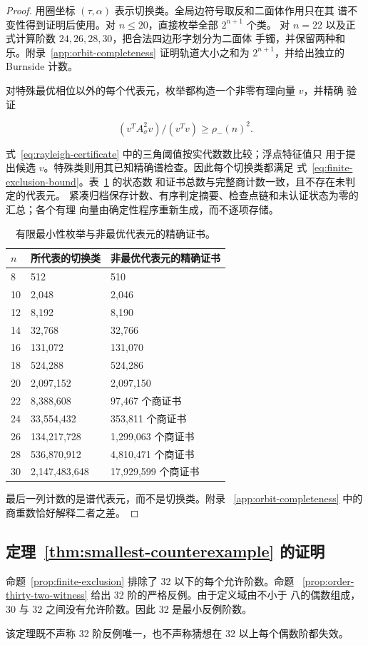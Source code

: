 \begin{proof}
用圈坐标 \((\tau,\alpha)\) 表示切换类。全局边符号取反和二面体作用只在其
谱不变性得到证明后使用。对 \(n\leq 20\)，直接枚举全部 \(2^{n+1}\) 个类。
对 \(n=22\) 以及正式计算阶数 \(24,26,28,30\)，把合法四边形字划分为二面体
手镯，并保留两种和乐。附录~\ref{app:orbit-completeness} 证明轨道大小之和为
\(2^{n+1}\)，并给出独立的 Burnside 计数。

对特殊最优相位以外的每个代表元，枚举都构造一个非零有理向量 \(v\)，并精确
验证

\begin{equation}
\label{eq:rayleigh-certificate}
(v^T A_\sigma^{2} v)/(v^T v) \geq  \rho_-(n)^{2}.
\end{equation}

式~\eqref{eq:rayleigh-certificate} 中的三角阈值按实代数数比较；浮点特征值只
用于提出候选 \(v\)。特殊类则用其已知精确谱检查。因此每个切换类都满足
式~\eqref{eq:finite-exclusion-bound}。表~\ref{tab:minimality-counts} 的状态数
和证书总数与完整商计数一致，且不存在未判定的代表元。
紧凑归档保存计数、有序判定摘要、检查点链和未认证状态为零的汇总；各个有理
向量由确定性程序重新生成，而不逐项存储。

\begin{table}[tbp]
\centering
\caption{有限最小性枚举与非最优代表元的精确证书。}
\label{tab:minimality-counts}
\begingroup
\renewcommand{\arraystretch}{1.12}
\begin{tabular}{lll}
\toprule
\(n\) & 所代表的切换类 & 非最优代表元的精确证书 \\
\midrule
8 & 512 & 510 \\
10 & 2,048 & 2,046 \\
12 & 8,192 & 8,190 \\
14 & 32,768 & 32,766 \\
16 & 131,072 & 131,070 \\
18 & 524,288 & 524,286 \\
20 & 2,097,152 & 2,097,150 \\
22 & 8,388,608 & 97,467 个商证书 \\
24 & 33,554,432 & 353,811 个商证书 \\
26 & 134,217,728 & 1,299,063 个商证书 \\
28 & 536,870,912 & 4,810,471 个商证书 \\
30 & 2,147,483,648 & 17,929,599 个商证书 \\
\bottomrule
\end{tabular}
\endgroup
\end{table}

最后一列计数的是谱代表元，而不是切换类。附录~
\ref{app:orbit-completeness} 中的商重数恰好解释二者之差。

\end{proof}
\subsection{定理~\ref{thm:smallest-counterexample} 的证明}

命题~\ref{prop:finite-exclusion} 排除了 32 以下的每个允许阶数。命题~
\ref{prop:order-thirty-two-witness} 给出 32 阶的严格反例。由于定义域由不小于
八的偶数组成，30 与 32 之间没有允许阶数。因此 32 是最小反例阶数。

该定理既不声称 32 阶反例唯一，也不声称猜想在 32 以上每个偶数阶都失效。
